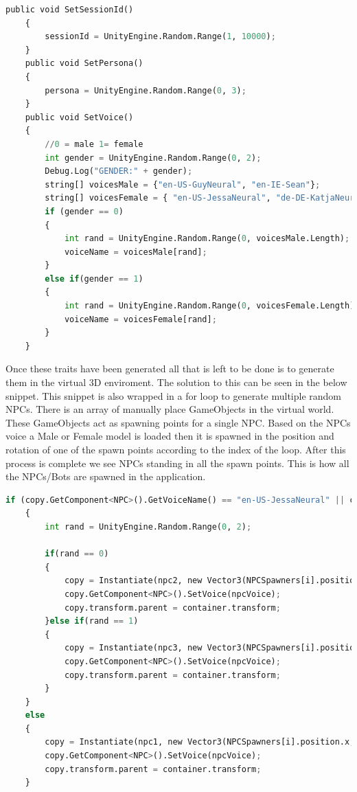 \begin{lstlisting}[language=python]
    public void SetSessionId()
    {
        sessionId = UnityEngine.Random.Range(1, 10000);
    }
    public void SetPersona()
    {
        persona = UnityEngine.Random.Range(0, 3);
    }
    public void SetVoice()
    {
        //0 = male 1= female
        int gender = UnityEngine.Random.Range(0, 2);
        Debug.Log("GENDER:" + gender);
        string[] voicesMale = {"en-US-GuyNeural", "en-IE-Sean"};
        string[] voicesFemale = { "en-US-JessaNeural", "de-DE-KatjaNeural" };
        if (gender == 0)
        {
            int rand = UnityEngine.Random.Range(0, voicesMale.Length);
            voiceName = voicesMale[rand];
        }
        else if(gender == 1)
        {
            int rand = UnityEngine.Random.Range(0, voicesFemale.Length);
            voiceName = voicesFemale[rand];
        }
    }
\end{lstlisting}

Once these traits have been generated all that is left to be done is to generate them in the virtual 3D enviroment. The solution to this can be seen in the below snippet.
This snippet is also wrapped in a for loop to generate multiple random NPCs. There is an array of manually place GameObjects in the virtual world. These GameObjects act as spawning points for a single NPC. Based on the NPCs voice a Male or Female model is loaded then it is spawned in the position and rotation of one of the spawn points according to the index of the loop. After this process is complete we see NPCs standing in all the spawn points. This is how all the NPCs/Bots are spawned in the application.\newline

\begin{lstlisting}[language=python]
    if (copy.GetComponent<NPC>().GetVoiceName() == "en-US-JessaNeural" || copy.GetComponent<NPC>().GetVoiceName() == "de-DE-KatjaNeural")
    {
        int rand = UnityEngine.Random.Range(0, 2);

        if(rand == 0)
        {
            copy = Instantiate(npc2, new Vector3(NPCSpawners[i].position.x, NPCSpawners[i].position.y, NPCSpawners[i].position.z), Quaternion.Euler(0, NPCSpawners[i].rotation.eulerAngles.y, 0));
            copy.GetComponent<NPC>().SetVoice(npcVoice);
            copy.transform.parent = container.transform;
        }else if(rand == 1)
        {
            copy = Instantiate(npc3, new Vector3(NPCSpawners[i].position.x, NPCSpawners[i].position.y, NPCSpawners[i].position.z), Quaternion.Euler(0, NPCSpawners[i].rotation.eulerAngles.y, 0));
            copy.GetComponent<NPC>().SetVoice(npcVoice);
            copy.transform.parent = container.transform;
        }
    }
    else
    {
        copy = Instantiate(npc1, new Vector3(NPCSpawners[i].position.x, NPCSpawners[i].position.y, NPCSpawners[i].position.z), Quaternion.Euler(0, NPCSpawners[i].rotation.eulerAngles.y, 0));
        copy.GetComponent<NPC>().SetVoice(npcVoice);
        copy.transform.parent = container.transform;
    }
\end{lstlisting}


